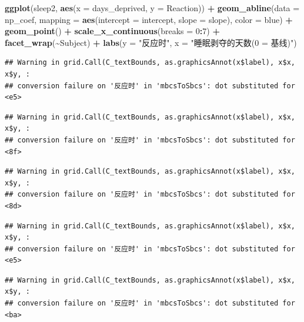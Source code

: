 \documentclass[
]{book}
\newenvironment{Shaded}{\begin{snugshade}}{\end{snugshade}}
\newcommand{\AttributeTok}[1]{\textcolor[rgb]{0.13,0.29,0.53}{#1}}
\newcommand{\DecValTok}[1]{\textcolor[rgb]{0.00,0.00,0.81}{#1}}
\newcommand{\FunctionTok}[1]{\textcolor[rgb]{0.13,0.29,0.53}{\textbf{#1}}}
\newcommand{\NormalTok}[1]{#1}
\newcommand{\SpecialCharTok}[1]{\textcolor[rgb]{0.81,0.36,0.00}{\textbf{#1}}}
\newcommand{\StringTok}[1]{\textcolor[rgb]{0.31,0.60,0.02}{#1}}
\begin{document}
\begin{Shaded}
\begin{Highlighting}[]
\FunctionTok{ggplot}\NormalTok{(sleep2, }\FunctionTok{aes}\NormalTok{(}\AttributeTok{x =}\NormalTok{ days\_deprived, }\AttributeTok{y =}\NormalTok{ Reaction)) }\SpecialCharTok{+}
  \FunctionTok{geom\_abline}\NormalTok{(}\AttributeTok{data =}\NormalTok{ np\_coef,}
              \AttributeTok{mapping =} \FunctionTok{aes}\NormalTok{(}\AttributeTok{intercept =}\NormalTok{ intercept,}
                            \AttributeTok{slope =}\NormalTok{ slope),}
              \AttributeTok{color =} \StringTok{\textquotesingle{}blue\textquotesingle{}}\NormalTok{) }\SpecialCharTok{+}
  \FunctionTok{geom\_point}\NormalTok{() }\SpecialCharTok{+}
  \FunctionTok{scale\_x\_continuous}\NormalTok{(}\AttributeTok{breaks =} \DecValTok{0}\SpecialCharTok{:}\DecValTok{7}\NormalTok{) }\SpecialCharTok{+}
  \FunctionTok{facet\_wrap}\NormalTok{(}\SpecialCharTok{\textasciitilde{}}\NormalTok{Subject) }\SpecialCharTok{+}
  \FunctionTok{labs}\NormalTok{(}\AttributeTok{y =} \StringTok{"反应时"}\NormalTok{, }\AttributeTok{x =} \StringTok{"睡眠剥夺的天数(0 = 基线)"}\NormalTok{)}
\end{Highlighting}
\end{Shaded}

\begin{verbatim}
## Warning in grid.Call(C_textBounds, as.graphicsAnnot(x$label), x$x, x$y, :
## conversion failure on '反应时' in 'mbcsToSbcs': dot substituted for <e5>
\end{verbatim}

\begin{verbatim}
## Warning in grid.Call(C_textBounds, as.graphicsAnnot(x$label), x$x, x$y, :
## conversion failure on '反应时' in 'mbcsToSbcs': dot substituted for <8f>
\end{verbatim}

\begin{verbatim}
## Warning in grid.Call(C_textBounds, as.graphicsAnnot(x$label), x$x, x$y, :
## conversion failure on '反应时' in 'mbcsToSbcs': dot substituted for <8d>
\end{verbatim}

\begin{verbatim}
## Warning in grid.Call(C_textBounds, as.graphicsAnnot(x$label), x$x, x$y, :
## conversion failure on '反应时' in 'mbcsToSbcs': dot substituted for <e5>
\end{verbatim}

\begin{verbatim}
## Warning in grid.Call(C_textBounds, as.graphicsAnnot(x$label), x$x, x$y, :
## conversion failure on '反应时' in 'mbcsToSbcs': dot substituted for <ba>
\end{verbatim}
\end{document}
